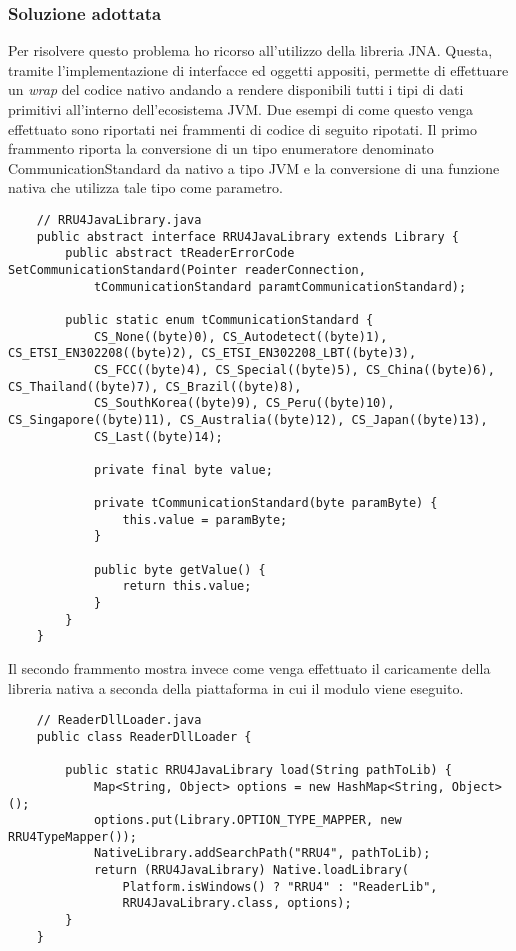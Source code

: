 \subsubsection*{Soluzione adottata}
Per risolvere questo problema ho ricorso all'utilizzo della libreria JNA. Questa, tramite l'implementazione di interfacce ed oggetti appositi, 
permette di effettuare un \emph{wrap} del codice nativo andando a rendere disponibili tutti i tipi di dati primitivi all'interno 
dell'ecosistema JVM. Due esempi di come questo venga effettuato sono riportati nei frammenti di codice di seguito ripotati.
Il primo frammento riporta la conversione di un tipo enumeratore denominato CommunicationStandard da nativo a tipo JVM e la conversione
di una funzione nativa che utilizza tale tipo come parametro.
\begin{lstlisting}
    // RRU4JavaLibrary.java
    public abstract interface RRU4JavaLibrary extends Library {
        public abstract tReaderErrorCode SetCommunicationStandard(Pointer readerConnection, 
            tCommunicationStandard paramtCommunicationStandard);

        public static enum tCommunicationStandard {
            CS_None((byte)0), CS_Autodetect((byte)1), CS_ETSI_EN302208((byte)2), CS_ETSI_EN302208_LBT((byte)3), 
            CS_FCC((byte)4), CS_Special((byte)5), CS_China((byte)6), CS_Thailand((byte)7), CS_Brazil((byte)8), 
            CS_SouthKorea((byte)9), CS_Peru((byte)10), CS_Singapore((byte)11), CS_Australia((byte)12), CS_Japan((byte)13), 
            CS_Last((byte)14);
    
            private final byte value;
    
            private tCommunicationStandard(byte paramByte) {
                this.value = paramByte;
            }
            
            public byte getValue() {
                return this.value;
            }
        }
    }
\end{lstlisting}
Il secondo frammento mostra invece come venga effettuato il caricamente della libreria nativa a seconda della piattaforma
in cui il modulo viene eseguito.
\begin{lstlisting}
    // ReaderDllLoader.java
    public class ReaderDllLoader {
        
        public static RRU4JavaLibrary load(String pathToLib) {
		    Map<String, Object> options = new HashMap<String, Object>();
		    options.put(Library.OPTION_TYPE_MAPPER, new RRU4TypeMapper());
            NativeLibrary.addSearchPath("RRU4", pathToLib);
            return (RRU4JavaLibrary) Native.loadLibrary(
		        Platform.isWindows() ? "RRU4" : "ReaderLib",
		        RRU4JavaLibrary.class, options);
        }
    }
\end{lstlisting}

